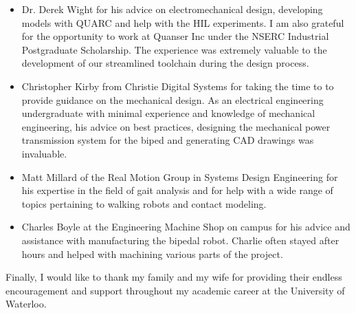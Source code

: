 \begin{itemize}
    \item Dr. Derek Wight for his advice on electromechanical design, developing models with QUARC and help with the HIL experiments. I am also grateful for the opportunity to work at Quanser Inc under the NSERC Industrial Postgraduate Scholarship. The experience was extremely valuable to the development of our streamlined toolchain during the design process. \\

    \item Christopher Kirby from Christie Digital Systems for taking the time to to provide guidance on the mechanical design. As an electrical engineering undergraduate with minimal experience and knowledge of mechanical engineering, his advice on best  practices, designing the mechanical power transmission system for the biped and generating CAD drawings was invaluable. \\

    \item Matt Millard of the Real Motion Group in Systems Design Engineering for his expertise in the field of gait analysis and for help with a wide range of topics pertaining to walking robots and contact modeling.  \\

    \item Charles Boyle at the Engineering Machine Shop on campus for his advice and assistance with manufacturing the bipedal robot. Charlie often stayed after hours and helped with machining various parts of the project.  \\

\end{itemize}

Finally, I would like to thank my family and my wife for providing their endless encouragement and support throughout my academic career at the University of Waterloo. 

\cleardoublepage





\renewcommand\contentsname{Table of Contents}
\tableofcontents
\cleardoublepage
{}



